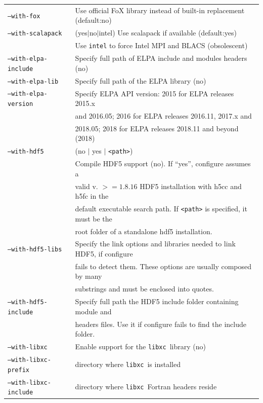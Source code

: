 \documentclass[12pt,a4paper]{article}
\def\libxc{\texttt{libxc}}
\begin{document}
\begin{tabular}{ll}
\texttt{--with-fox} & Use official FoX library instead of built-in replacement (default:no)\\
\texttt{--with-scalapack}& (yes$|$no$|$intel) Use scalapack if available (default:yes) \\
                         &Use \texttt{intel} to force Intel MPI and BLACS (obsolescent)\\
\texttt{--with-elpa-include}&   Specify full path of ELPA include and modules
  headers (no)\\
\texttt{--with-elpa-lib}& Specify full path of the ELPA library (no)\\
\texttt{--with-elpa-version}& Specify ELPA API version: 2015 for ELPA releases 2015.x\\
                            & and 2016.05; 2016 for ELPA releases 2016.11, 2017.x and\\
			    & 2018.05; 2018 for ELPA releases 2018.11 and beyond (2018)\\
\texttt{--with-hdf5}&  (no $|$  yes $|$ \texttt{<path>}) \\
	                    & Compile HDF5 support (no). If ``yes'', configure assumes a \\
                            & valid v. $>=1.8.16$ HDF5 installation with h5cc and h5fc in the \\
                            &  default executable search path. If \texttt{<path>} is specified, it must be the  \\
                            & root folder of a standalone hdf5 installation. \\
\texttt{--with-hdf5-libs}   & Specify the link options and libraries needed to link HDF5, if configure \\
                            &  fails to detect them. These options are usually composed by many \\
                            & substrings and must be enclosed into quotes. \\
\texttt{--with-hdf5-include}& Specify full path the HDF5 include folder containing module and \\
&  headers files. Use it if configure fails to find the include folder. \\
\texttt{--with-libxc}        & Enable support for the \libxc\ library (no) \\
\texttt{--with-libxc-prefix} & directory where \libxc\ is installed \\
\texttt{--with-libxc-include}& directory where \libxc\ Fortran headers reside\\
\end{tabular}
\end{document}

